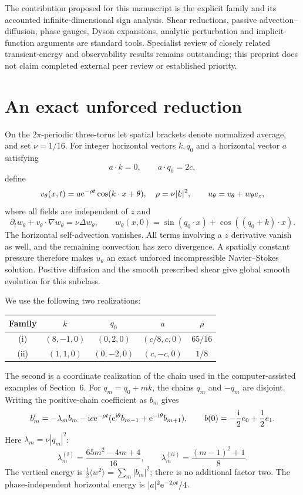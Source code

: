 \documentclass[11pt]{article}
\begin{document}
The contribution proposed for this manuscript is the explicit family and
its accounted infinite-dimensional sign analysis. Shear reductions,
passive advection--diffusion, phase gauges, Dyson expansions, analytic
perturbation and implicit-function arguments are standard tools.
Specialist review of closely related transient-energy and observability
results remains outstanding; this preprint does not claim completed
external peer review or established priority.

\section{An exact unforced reduction}
On the $2\pi$-periodic three-torus let spatial brackets denote normalized
average, and set $\nu=1/16$. For integer horizontal vectors $k,q_0$ and a
horizontal vector $a$ satisfying
\[
 a\cdot k=0,\qquad a\cdot q_0=2c,
\]
define
\[
 v_\theta(x,t)=a\mathrm e^{-\rho t}\cos(k\cdot x+\theta),\quad
 \rho=\nu|k|^2,\qquad
 u_\theta=v_\theta+w_\theta e_z,
\]
where all fields are independent of $z$ and
\[
 \partial_t w_\theta+v_\theta\cdot\nabla w_\theta=\nu\Delta w_\theta,
 \qquad
 w_\theta(x,0)=\sin(q_0\cdot x)+\cos((q_0+k)\cdot x).
\]
The horizontal self-advection vanishes. All terms involving a $z$ derivative
vanish as well, and the remaining convection has zero divergence.
A spatially constant pressure therefore makes $u_\theta$ an exact
unforced incompressible Navier--Stokes solution. Positive diffusion and the
smooth prescribed shear give global smooth evolution for this subclass.

We use the following two realizations:
\begin{center}
\begin{tabular}{c c c c c}
\toprule
Family & $k$ & $q_0$ & $a$ & $\rho$\\
\midrule
(i)&$(8,-1,0)$&$(0,2,0)$&$(c/8,c,0)$&$65/16$\\
(ii)&$(1,1,0)$&$(0,-2,0)$&$(c,-c,0)$&$1/8$\\
\bottomrule
\end{tabular}
\end{center}
The second is a coordinate realization of the chain used in the
computer-assisted examples of Section~6.
For $q_m=q_0+mk$, the chains $q_m$ and $-q_m$ are disjoint.
Writing the positive-chain coefficient as $b_m$ gives
\[
 b_m'=-\lambda_m b_m-\mathrm i c\mathrm e^{-\rho t}
    (\mathrm e^{\mathrm i\theta}b_{m-1}+\mathrm e^{-\mathrm i\theta}b_{m+1}),\qquad
 b(0)=-\frac{\mathrm i}{2}e_0+\frac12e_1.
\]
Here $\lambda_m=\nu|q_m|^2$:
\[
 \lambda_m^{(i)}=\frac{65m^2-4m+4}{16},\qquad
 \lambda_m^{(ii)}=\frac{(m-1)^2+1}{8}.
\]
The vertical energy is $\frac12\langle w^2\rangle=\sum_m|b_m|^2$;
there is no additional factor two. The phase-independent horizontal energy
is $|a|^2\mathrm e^{-2\rho t}/4$.
\end{document}
